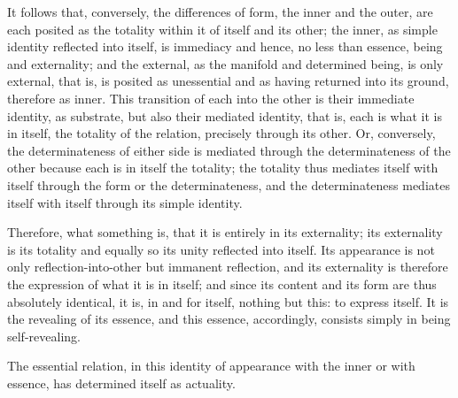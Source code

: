 It follows that, conversely,
the differences of form,
the inner and the outer,
are each posited as the totality
within it of itself and its other;
the inner, as simple identity
reflected into itself, is immediacy
and hence, no less than essence,
being and externality;
and the external,
as the manifold and determined being,
is only external,
that is, is posited as unessential
and as having returned into its ground,
therefore as inner.
This transition of each into the other is
their immediate identity, as substrate,
but also their mediated identity, that is,
each is what it is in itself,
the totality of the relation,
precisely through its other.
Or, conversely, the determinateness of
either side is mediated through
the determinateness of the other
because each is in itself the totality;
the totality thus mediates itself with itself
through the form or the determinateness,
and the determinateness mediates
itself with itself through its simple identity.

Therefore, what something is, that it is
entirely in its externality;
its externality is its totality
and equally so its unity reflected into itself.
Its appearance is not only reflection-into-other
but immanent reflection,
and its externality is therefore
the expression of what it is in itself;
and since its content and its form
are thus absolutely identical,
it is, in and for itself, nothing but this:
to express itself.
It is the revealing of its essence,
and this essence, accordingly,
consists simply in being self-revealing.

The essential relation, in this identity
of appearance with the inner or with essence,
has determined itself as actuality.
